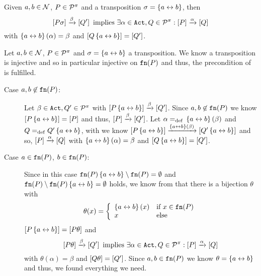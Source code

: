 
\begin{cor}
\label{cor_subst_trans_partIII}
Given $a,b\in\mathcal N$, $P\in\mathcal P^{\pi}$ and a transposition $\sigma=\left\{a\leftrightarrow{}b\right\}$, then
\[\left[P\sigma\right]\xrightarrow{\beta}\left[Q'\right]\text{ implies } \exists\alpha\in\mathtt{Act},Q\in\mathcal P^{\pi}: \left[P\right]\xrightarrow{\alpha}\left[Q\right]\]
with $\left\{a\leftrightarrow{}b\right\}(\alpha)=\beta$ and $\left[Q\left\{a\leftrightarrow{}b\right\}\right]=\left[Q'\right]$.
\end{cor}
\begin{prf}
Let $a,b\in\mathcal N$, $P\in\mathcal P^{\pi}$ and $\sigma=\left\{a\leftrightarrow{}b\right\}$ a transposition. We know a transposition is injective and so in particular injective on $\mathtt{fn}(P)$ and thus, the precondition of  is fulfilled.
\begin{description}
\item[Case $a,b\not\in\mathtt{fn}(P)$:] Let $\beta\in\mathtt{Act},Q'\in\mathcal P^{\pi}$ with $\left[P\left\{a\leftrightarrow{}b\right\}\right]\xrightarrow{\beta}\left[Q'\right]$. Since $a,b\not\in\mathtt{fn}(P)$ we know $\left[P\left\{a\leftrightarrow{}b\right\}\right]=\left[P\right]$ and thus, $\left[P\right]\xrightarrow{\beta}\left[Q'\right]$. Let $\alpha=_{\mathrm{def}}{}\left\{a\leftrightarrow{}b\right\}(\beta)$ and $Q=_{\mathrm{def}}{}Q'\left\{a\leftrightarrow{}b\right\}$, with  we know $\left[P\left\{a\leftrightarrow{}b\right\}\right]\xrightarrow{\left\{a\leftrightarrow{}b\right\}(\beta)}\left[Q'\left\{a\leftrightarrow{}b\right\}\right]$ and so, $\left[P\right]\xrightarrow{\alpha}\left[Q\right]$ with $\left\{a\leftrightarrow{}b\right\}(\alpha)=\beta$ and $\left[Q\left\{a\leftrightarrow{}b\right\}\right]=\left[Q'\right]$.

\item[Case $a\in\mathtt{fn}(P)$, $b\in\mathtt{fn}(P)$:] Since in this case $\mathtt{fn}(P)\left\{a\leftrightarrow{}b\right\}\setminus\mathtt{fn}(P)=\emptyset$ and $\mathtt{fn}(P)\setminus\mathtt{fn}(P)\left\{a\leftrightarrow{}b\right\}=\emptyset$ holds, we know from  that there is a bijection $\theta$ with
\[\theta(x)=\left\{\begin{array}{ll}
			\left\{a\leftrightarrow{}b\right\}(x) & \text{if } x\in\mathtt{fn}(P) \\			
			x & \text{else}
		\end{array}\right.\]
$\left[P\left\{a\leftrightarrow{}b\right\}\right]=\left[P\theta\right]$ and
\[\left[P\theta\right]\xrightarrow{\beta}\left[Q'\right] \text{ implies } \exists\alpha\in\mathtt{Act},Q\in\mathcal P^{\pi}:\left[P\right]\xrightarrow{\alpha}\left[Q\right]\]
with $\theta(\alpha)=\beta$ and $\left[Q\theta\right]=\left[Q'\right]$. Since $a,b\in\mathtt{fn}(P)$ we know $\theta=\left\{a\leftrightarrow{}b\right\}$ and thus, we found everything we need.


\end{description}
\end{prf}
